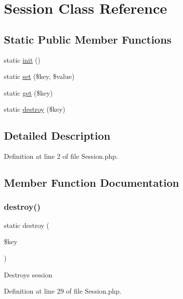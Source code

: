 \hypertarget{class_session}{}\section{Session Class Reference}
\label{class_session}
\subsection*{Static Public Member Functions}
\begin{DoxyCompactItemize}
\item 
static \hyperlink{class_session_a9f0be6ae273d3669e11c29910a0be338}{init} ()
\item 
static \hyperlink{class_session_aa485369b2925858d92e468d405bd0798}{set} (\$key, \$value)
\item 
static \hyperlink{class_session_a15e2679f2a8f6fa4d60757f4d65413ac}{get} (\$key)
\item 
static \hyperlink{class_session_a84a343032e96995b7c252c719ddc764b}{destroy} (\$key)
\end{DoxyCompactItemize}


\subsection{Detailed Description}


Definition at line 2 of file Session.\+php.



\subsection{Member Function Documentation}
\hypertarget{class_session_a84a343032e96995b7c252c719ddc764b}{}\label{class_session_a84a343032e96995b7c252c719ddc764b} 
\subsubsection{\texorpdfstring{destroy()}{destroy()}}
{\footnotesize\ttfamily static destroy (\begin{DoxyParamCaption}\item[{}]{\$key }\end{DoxyParamCaption})\hspace{0.3cm}{\ttfamily [static]}}

Destroys session 

Definition at line 29 of file Session.\+php.



